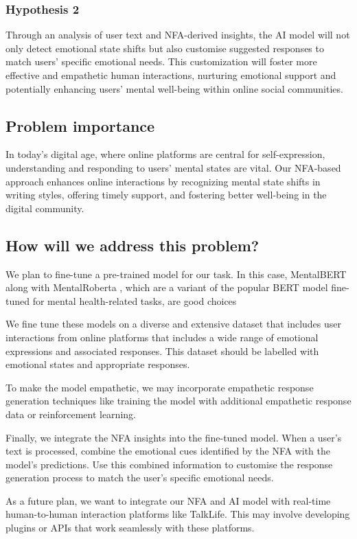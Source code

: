 \documentclass[conference,compsoc]{IEEEtran}
\begin{document}
\subsubsection{Hypothesis 2}
Through an analysis of user text and NFA-derived insights, the AI model will not only detect emotional state shifts but also customise suggested responses to match users' specific emotional needs. This customization will foster more effective and empathetic human interactions, nurturing emotional support and potentially enhancing users' mental well-being within online social communities.

\subsection{Problem importance}
In today's digital age, where online platforms are central for self-expression, understanding and responding to users' mental states are vital. Our NFA-based approach enhances online interactions by recognizing mental state shifts in writing styles, offering timely support, and fostering better well-being in the digital community.

\subsection{How will we address this problem?}
We plan to fine-tune a pre-trained model for our task. In this case, MentalBERT along with MentalRoberta \citep{Ji+21:MentalBERT}, which are a variant of the popular BERT model fine-tuned for mental health-related tasks, are good choices

We fine tune these models on a diverse and extensive dataset that includes user interactions from online platforms that includes a wide range of emotional expressions and associated responses. This dataset should be labelled with emotional states and appropriate responses.

To make the model empathetic, we may incorporate empathetic response generation techniques like training the model with additional empathetic response data or reinforcement learning.

Finally, we integrate the NFA insights into the fine-tuned model. When a user's text is processed, combine the emotional cues identified by the NFA with the model's predictions. Use this combined information to customise the response generation process to match the user's specific emotional needs.

As a future plan, we want to integrate our NFA and AI model with real-time human-to-human interaction platforms like TalkLife. This may involve developing plugins or APIs that work seamlessly with these platforms.
\end{document}
